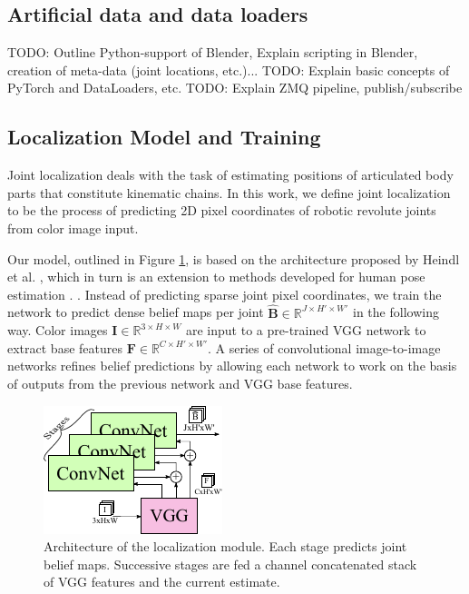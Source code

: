 \documentclass[conference]{IEEEtran}
\begin{document}
\subsection{Artificial data and data loaders}

TODO: Outline Python-support of Blender, Explain scripting in Blender, creation of meta-data (joint locations, etc.)...
TODO: Explain basic concepts of PyTorch and DataLoaders, etc.
TODO: Explain ZMQ pipeline, publish/subscribe

\subsection{Localization Model and Training}

    Joint localization deals with the task of estimating positions of articulated body parts that constitute kinematic chains. In this work, we define joint localization to be the process of predicting 2D pixel coordinates of robotic revolute joints from color image input. 
    
    Our model, outlined in Figure \ref{fig:jointmodel}, is based on the architecture proposed by Heindl et al. \cite{cheind2019disp}, which in turn is an extension to methods developed for human pose estimation \cite{cao2017realtime, newell2016stacked}.  . Instead of predicting sparse joint pixel coordinates, we train the network to predict dense belief maps per joint $\hat{\mathbf{B}} \in \mathbb{R}^{J \times H' \times W'}$ in the following way. Color images $\mathbf{I} \in \mathbb{R}^{3 \times H\times W}$ are input to a pre-trained VGG network \cite{simonyan2014very} to extract base features $\mathbf{F} \in \mathbb{R}^{C \times H' \times W'}$. A series of convolutional image-to-image networks refines belief predictions by allowing each network to work on the basis of outputs from the previous network and VGG base features.

    \begin{figure} [!h]
        \centering
        \includegraphics[width=0.7\columnwidth]{figures/joint_model/joint_model.pdf}
        \caption {
            \label{fig:jointmodel} 
            Architecture of the localization module. Each stage predicts joint belief maps. Successive stages are fed a channel concatenated stack of VGG features and the current estimate.
        }
    \end{figure}
\end{document}
